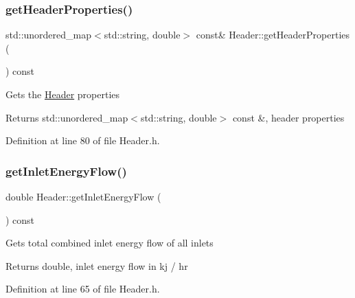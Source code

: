 \mbox{\label{class_header_a12c910088b929c8346a21c631af1fd90}} 
\subsubsection{\texorpdfstring{get\+Header\+Properties()}{getHeaderProperties()}}
{\footnotesize\ttfamily std\+::unordered\+\_\+map$<$std\+::string, double$>$ const\& Header\+::get\+Header\+Properties (\begin{DoxyParamCaption}{ }\end{DoxyParamCaption}) const\hspace{0.3cm}{\ttfamily [inline]}}

Gets the \hyperlink{class_header}{Header} properties \begin{DoxyReturn}{Returns}
std\+::unordered\+\_\+map$<$std\+::string, double$>$ const \&, header properties 
\end{DoxyReturn}


Definition at line 80 of file Header.\+h.

\mbox{\label{class_header_a2a30ee96fa76bab1533cb9ceea0c8af3}} 
\subsubsection{\texorpdfstring{get\+Inlet\+Energy\+Flow()}{getInletEnergyFlow()}}
{\footnotesize\ttfamily double Header\+::get\+Inlet\+Energy\+Flow (\begin{DoxyParamCaption}{ }\end{DoxyParamCaption}) const\hspace{0.3cm}{\ttfamily [inline]}}

Gets total combined inlet energy flow of all inlets \begin{DoxyReturn}{Returns}
double, inlet energy flow in kj / hr 
\end{DoxyReturn}


Definition at line 65 of file Header.\+h.

\mbox{\label{class_header_ad572e6144481b9e9f65004aacebd701c}} 
